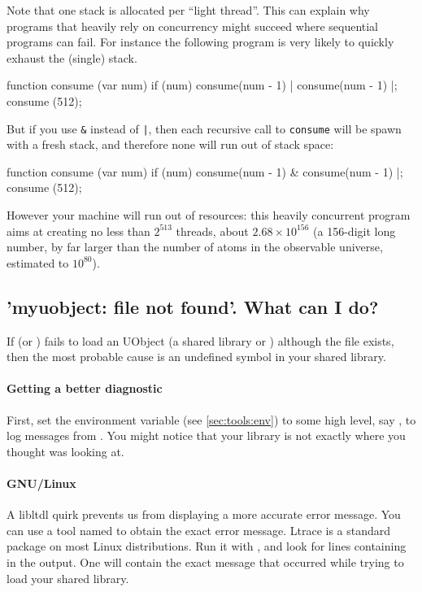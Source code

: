 Note that one stack is allocated per ``light thread''.  This can
explain why programs that heavily rely on concurrency might succeed
where sequential programs can fail.  For instance the following
program is very likely to quickly exhaust the (single) stack.

\begin{urbiunchecked}
function consume (var num)
{
  if (num)
    consume(num - 1) | consume(num - 1)
}|;
consume (512);
\end{urbiunchecked}

But if you use \lstinline{&} instead of \lstinline{|}, then each
recursive call to \lstinline{consume} will be spawn with a fresh
stack, and therefore none will run out of stack space:

\begin{urbiunchecked}
function consume (var num)
{
  if (num)
    consume(num - 1) & consume(num - 1)
}|;
consume (512);
\end{urbiunchecked}

However your machine will run out of resources: this heavily
concurrent program aims at creating no less than $2^{513}$ threads,
about $2.68 \times 10^{156}$ (a 156-digit long number, by far larger
than the number of atoms in the observable universe, estimated to
$10^{80}$).

\subsection{'myuobject: file not found'. What can I do?}
If  (or ) fails to load an UObject (a
shared library or ) although the file exists, then the most
probable cause is an undefined symbol in your shared library.

\paragraph{Getting a better diagnostic}
First, set the  environment variable (see
\autoref{sec:tools:env}) to some high level, say , to log
messages from .  You might notice that your library is
not exactly where you thought  was looking at.

\paragraph{GNU/Linux}
A libltdl quirk prevents us from displaying a more accurate error message.
You can use a tool named  to obtain the exact error message.
Ltrace is a standard package on most Linux distributions.  Run it with
, and look for lines containing
 in the output. One will contain the exact message that
occurred while trying to load your shared library.

